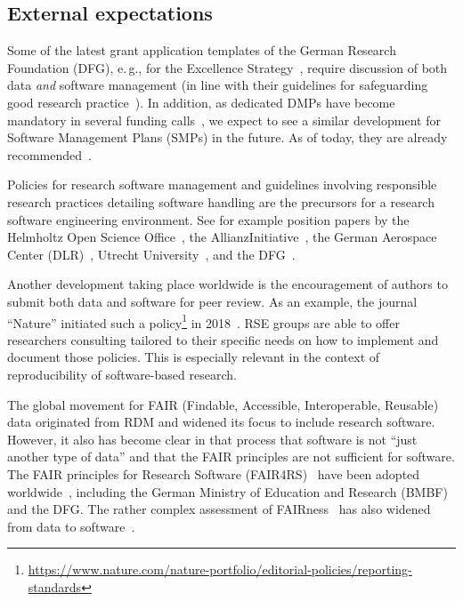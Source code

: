 \documentclass[a4paper]{article}
\newcommand*{\eg}{e.\,g.,\xspace}
\begin{document}
\subsection{External expectations}

Some of the latest grant application templates of the German Research Foundation (DFG), \eg{} for the Excellence Strategy~\autocite{DFG_ExStra130}, require discussion of both data \emph{and} software management (in line with their guidelines for safeguarding good research practice~\autocite{dfg_gsp}).
In addition, as dedicated DMPs have become mandatory in several funding calls~\autocite{FDM_Info_FDM}, we expect to see a similar development for Software Management Plans (SMPs) in the future.
As of today, they are already recommended~\autocite{FDM_Info_SMP}.

Policies for research software management and guidelines involving responsible research practices detailing software handling are the precursors for a research software engineering environment.
See for example position papers by
 the Helmholtz Open Science Office~\autocite{Helmholtz2019a,Helmholtz2019b},
 the AllianzInitiative~\autocite{Konrad2021},
 the German Aerospace Center (DLR)~\autocite{Schlauch2018b},
 Utrecht University~\autocite{Utrecht2016b},
 and the DFG~\autocite{dfg_gsp}.

Another development taking place worldwide is the encouragement of authors to submit both data and software for peer review.
As an example, the journal “Nature” initiated such a policy\footnote{\url{https://www.nature.com/nature-portfolio/editorial-policies/reporting-standards}} in 2018~\autocite{Nature2018}.
RSE groups are able to offer researchers consulting tailored to their specific needs on how to implement and document those policies.
This is especially relevant in the context of reproducibility of software-based research.

The global movement for FAIR (Findable, Accessible, Interoperable, Reusable) data originated from RDM and widened its focus to include research software.
However, it also has become clear in that process that software is not “just another type of data” and that the FAIR principles are not sufficient for software.
The FAIR principles for Research Software (FAIR4RS)~\autocite{ChueHong2022} have been adopted worldwide~\autocite{Barker2024}, including the German Ministry of Education and Research (BMBF) and the DFG.
The rather complex assessment of FAIRness~\autocite{Wilkinson2023,FAIRmaturity} has also widened from data to software~\autocite{Lamprecht2020}.
\end{document}
